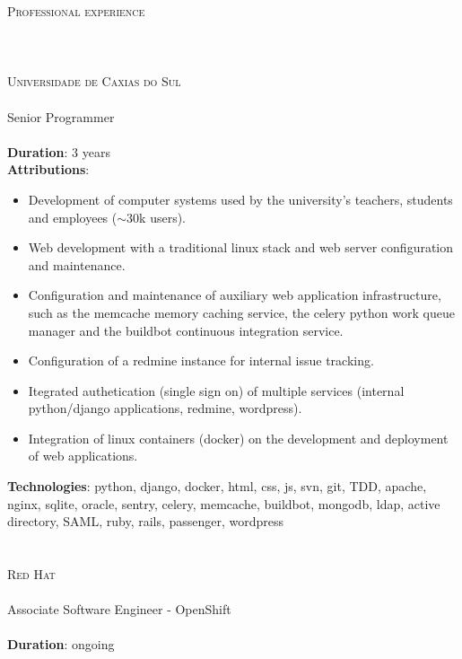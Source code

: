 \noindent \textsc{\Huge Professional experience}
\\\\\\\\
\noindent \textsc{\Large Universidade de Caxias do Sul}
\\\\
Senior Programmer
\\\\
\textbf{Duration}: 3 years \\
\textbf{Attributions}:
    \begin{itemize}
            \vspace{-2.5mm}
            \itemsep-1mm
        \item Development of computer systems used by the university's
            teachers, students and employees ($\sim$30k users).
        \item Web development with a traditional linux stack and web server
            configuration and maintenance.
        \item Configuration and maintenance of auxiliary web application
            infrastructure, such as the memcache memory caching service, the
            celery python work queue manager and the buildbot continuous
            integration service.
        \item Configuration of a redmine instance for internal issue tracking.
        \item Itegrated authetication (single sign on) of multiple services
            (internal python/django applications, redmine, wordpress).
        \item Integration of linux containers (docker) on the development and
            deployment of web applications.
    \end{itemize}
\textbf{Technologies}:
    python, django, docker, html, css, js, svn, git, TDD, apache, nginx,
    sqlite, oracle, sentry, celery, memcache, buildbot, mongodb, ldap, active
    directory, SAML, ruby, rails, passenger, wordpress
\\\\\\
\noindent \textsc{\Large Red Hat}
\\\\
Associate Software Engineer - OpenShift
\\\\
\textbf{Duration}: ongoing

